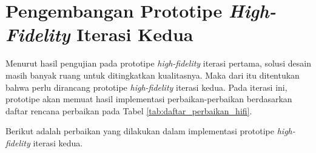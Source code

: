 \section{Pengembangan Prototipe \textit{High-Fidelity} Iterasi Kedua}
\label{sec:hifi_2}

Menurut hasil pengujian pada prototipe \textit{high-fidelity} iterasi pertama, solusi desain masih banyak ruang untuk ditingkatkan kualitasnya. Maka dari itu ditentukan bahwa perlu dirancang prototipe \textit{high-fidelity} iterasi kedua. Pada iterasi ini, prototipe akan memuat hasil implementasi perbaikan-perbaikan berdasarkan daftar rencana perbaikan pada Tabel \ref{tab:daftar_perbaikan_hifi}.


Berikut adalah perbaikan yang dilakukan dalam implementasi prototipe \textit{high-fidelity} iterasi kedua.

